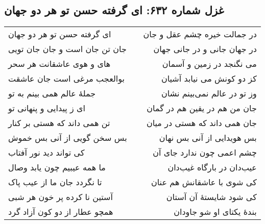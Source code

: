\begin{center}
\section*{غزل شماره ۶۳۲: ای گرفته حسن تو هر دو جهان}
\label{sec:632}
\begin{longtable}{l p{0.5cm} r}
ای گرفته حسن تو هر دو جهان
&&
در جمالت خیره چشم عقل و جان
\\
جان تن جان است و جان جان تویی
&&
در جهان جانی و در جانی جهان
\\
های و هوی عاشقانت هر سحر
&&
می نگنجد در زمین و آسمان
\\
بوالعجب مرغی است جان عاشقت
&&
کز دو کونش می نیابد آشیان
\\
جملهٔ عالم همی بینم به تو
&&
وز تو در عالم نمی‌بینم نشان
\\
ای ز پیدایی و پنهانی تو
&&
جان من هم در یقین هم در گمان
\\
تن همی داند که هستی بر کنار
&&
جان همی داند که هستی در میان
\\
بس سخن گویی از آنی بس خموش
&&
بس هویدایی از آنی بس نهان
\\
کی تواند دید نور آفتاب
&&
چشم اعمی چون ندارد جای آن
\\
ما همه عیبیم چون یابد وصال
&&
عیب‌دان در بارگاه غیب‌دان
\\
تا نگردد جان ما از عیب پاک
&&
کی شوی با عاشقانش هم عنان
\\
آستین نا کرده پر خون هر شبی
&&
کی شود شایستهٔ آن آستان
\\
همچو عطار از دو کون آزاد گرد
&&
بندهٔ یکتای او شو جاودان
\\
\end{longtable}
\end{center}
